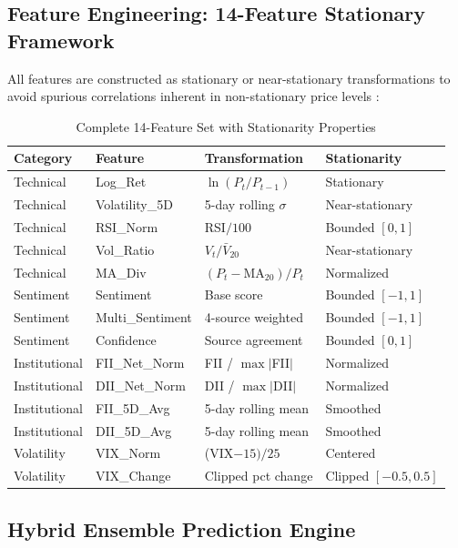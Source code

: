 \documentclass[12pt,a4paper]{article}
\begin{document}
\subsection{Feature Engineering: 14-Feature Stationary Framework}

All features are constructed as stationary or near-stationary transformations to avoid spurious correlations inherent in non-stationary price levels \cite{hamilton1989new}:

\begin{table}[H]
\centering
\caption{Complete 14-Feature Set with Stationarity Properties}
\begin{tabular}{@{}llll@{}}
\toprule
\textbf{Category} & \textbf{Feature} & \textbf{Transformation} & \textbf{Stationarity} \\
\midrule
Technical & Log\_Ret & $\ln(P_t/P_{t-1})$ & Stationary \\
Technical & Volatility\_5D & 5-day rolling $\sigma$ & Near-stationary \\
Technical & RSI\_Norm & RSI$/100$ & Bounded $[0,1]$ \\
Technical & Vol\_Ratio & $V_t / \bar{V}_{20}$ & Near-stationary \\
Technical & MA\_Div & $(P_t - \text{MA}_{20})/P_t$ & Normalized \\
Sentiment & Sentiment & Base score & Bounded $[-1,1]$ \\
Sentiment & Multi\_Sentiment & 4-source weighted & Bounded $[-1,1]$ \\
Sentiment & Confidence & Source agreement & Bounded $[0,1]$ \\
Institutional & FII\_Net\_Norm & FII / $\max|$FII$|$ & Normalized \\
Institutional & DII\_Net\_Norm & DII / $\max|$DII$|$ & Normalized \\
Institutional & FII\_5D\_Avg & 5-day rolling mean & Smoothed \\
Institutional & DII\_5D\_Avg & 5-day rolling mean & Smoothed \\
Volatility & VIX\_Norm & (VIX$-15)/25$ & Centered \\
Volatility & VIX\_Change & Clipped pct change & Clipped $[-0.5,0.5]$ \\
\bottomrule
\end{tabular}
\label{tab:features}
\end{table}

\subsection{Hybrid Ensemble Prediction Engine}
\end{document}
